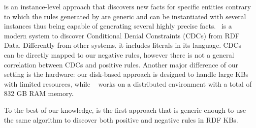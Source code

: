 
\cite{abedjan2014amending} is an instance-level approach that discovers new facts for specific entities contrary to which the rules generated by \krd are 
generic and can be instantiated with several instances thus being capable of generating several highly precise facts.~\cite{DBLP:conf/sigmod/FaridRIHC16} is a modern system to discover Conditional Denial Constraints (CDCs) from RDF Data. Differently from other systems, it includes literals in its language. CDCs can be directly mapped to our negative rules, however there is not a general correlation between CDCs and positive rules. Another major difference of
our setting is the hardware: our disk-based approach is designed to handle large KBs with limited resources, while ~\cite{DBLP:conf/sigmod/FaridRIHC16} works on a distributed environment with a total of 832 GB RAM memory.

To the best of our knowledge, \krd is the first approach that is generic enough to use the same algorithm to discover both positive and negative rules in RDF KBs.


